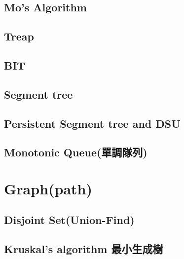 \clearpage

\subsection{Mo's Algorithm}


\subsection{Treap}


\subsection{BIT}


\subsection{Segment tree}


\clearpage

\subsection{Persistent Segment tree and DSU}


\subsection{Monotonic Queue(單調隊列)}


\section{Graph(path)}

\subsection{Disjoint Set(Union-Find)}


\subsection{Kruskal’s algorithm 最小生成樹}


